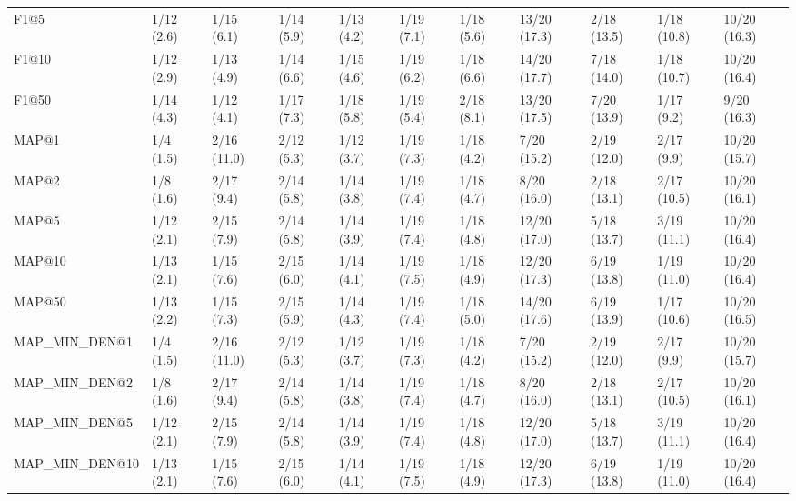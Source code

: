 \begin{tabular}{lllllllllll}
F1@5                        &     1/12 (2.6) &     1/15 (6.1) &    1/14 (5.9) &    1/13 (4.2) &  1/19 (7.1) &   1/18 (5.6) &   13/20 (17.3) &         2/18 (13.5) &  1/18 (10.8) &  10/20 (16.3) \\
F1@10                       &     1/12 (2.9) &     1/13 (4.9) &    1/14 (6.6) &    1/15 (4.6) &  1/19 (6.2) &   1/18 (6.6) &   14/20 (17.7) &         7/18 (14.0) &  1/18 (10.7) &  10/20 (16.4) \\
F1@50                       &     1/14 (4.3) &     1/12 (4.1) &    1/17 (7.3) &    1/18 (5.8) &  1/19 (5.4) &   2/18 (8.1) &   13/20 (17.5) &         7/20 (13.9) &   1/17 (9.2) &   9/20 (16.3) \\
MAP@1                       &      1/4 (1.5) &    2/16 (11.0) &    2/12 (5.3) &    1/12 (3.7) &  1/19 (7.3) &   1/18 (4.2) &    7/20 (15.2) &         2/19 (12.0) &   2/17 (9.9) &  10/20 (15.7) \\
MAP@2                       &      1/8 (1.6) &     2/17 (9.4) &    2/14 (5.8) &    1/14 (3.8) &  1/19 (7.4) &   1/18 (4.7) &    8/20 (16.0) &         2/18 (13.1) &  2/17 (10.5) &  10/20 (16.1) \\
MAP@5                       &     1/12 (2.1) &     2/15 (7.9) &    2/14 (5.8) &    1/14 (3.9) &  1/19 (7.4) &   1/18 (4.8) &   12/20 (17.0) &         5/18 (13.7) &  3/19 (11.1) &  10/20 (16.4) \\
MAP@10                      &     1/13 (2.1) &     1/15 (7.6) &    2/15 (6.0) &    1/14 (4.1) &  1/19 (7.5) &   1/18 (4.9) &   12/20 (17.3) &         6/19 (13.8) &  1/19 (11.0) &  10/20 (16.4) \\
MAP@50                      &     1/13 (2.2) &     1/15 (7.3) &    2/15 (5.9) &    1/14 (4.3) &  1/19 (7.4) &   1/18 (5.0) &   14/20 (17.6) &         6/19 (13.9) &  1/17 (10.6) &  10/20 (16.5) \\
MAP_MIN_DEN@1               &      1/4 (1.5) &    2/16 (11.0) &    2/12 (5.3) &    1/12 (3.7) &  1/19 (7.3) &   1/18 (4.2) &    7/20 (15.2) &         2/19 (12.0) &   2/17 (9.9) &  10/20 (15.7) \\
MAP_MIN_DEN@2               &      1/8 (1.6) &     2/17 (9.4) &    2/14 (5.8) &    1/14 (3.8) &  1/19 (7.4) &   1/18 (4.7) &    8/20 (16.0) &         2/18 (13.1) &  2/17 (10.5) &  10/20 (16.1) \\
MAP_MIN_DEN@5               &     1/12 (2.1) &     2/15 (7.9) &    2/14 (5.8) &    1/14 (3.9) &  1/19 (7.4) &   1/18 (4.8) &   12/20 (17.0) &         5/18 (13.7) &  3/19 (11.1) &  10/20 (16.4) \\
MAP_MIN_DEN@10              &     1/13 (2.1) &     1/15 (7.6) &    2/15 (6.0) &    1/14 (4.1) &  1/19 (7.5) &   1/18 (4.9) &   12/20 (17.3) &         6/19 (13.8) &  1/19 (11.0) &  10/20 (16.4) \\

\end{tabular}
